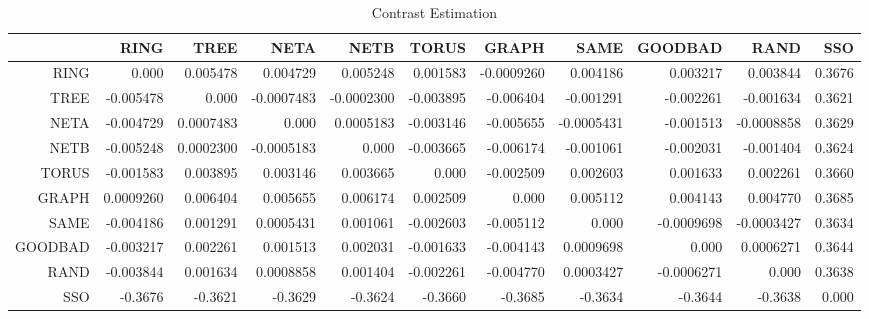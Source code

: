 \documentclass[a4paper,10pt]{article}
\begin{document}
\begin{landscape}
\begin{table}[!htp]
\centering\tiny
\caption{Contrast Estimation}
\begin{tabular}{
|r|r|r|r|r|r|r|r|r|r|r|}
\hline
 & RING& TREE& NETA& NETB& TORUS& GRAPH& SAME& GOODBAD& RAND& SSO\\
\hline
 RING&0.000&0.005478&0.004729&0.005248&0.001583&-0.0009260&0.004186&0.003217&0.003844&0.3676\\
\hline
 TREE&-0.005478&0.000&-0.0007483&-0.0002300&-0.003895&-0.006404&-0.001291&-0.002261&-0.001634&0.3621\\
\hline
 NETA&-0.004729&0.0007483&0.000&0.0005183&-0.003146&-0.005655&-0.0005431&-0.001513&-0.0008858&0.3629\\
\hline
 NETB&-0.005248&0.0002300&-0.0005183&0.000&-0.003665&-0.006174&-0.001061&-0.002031&-0.001404&0.3624\\
\hline
 TORUS&-0.001583&0.003895&0.003146&0.003665&0.000&-0.002509&0.002603&0.001633&0.002261&0.3660\\
\hline
 GRAPH&0.0009260&0.006404&0.005655&0.006174&0.002509&0.000&0.005112&0.004143&0.004770&0.3685\\
\hline
 SAME&-0.004186&0.001291&0.0005431&0.001061&-0.002603&-0.005112&0.000&-0.0009698&-0.0003427&0.3634\\
\hline
 GOODBAD&-0.003217&0.002261&0.001513&0.002031&-0.001633&-0.004143&0.0009698&0.000&0.0006271&0.3644\\
\hline
 RAND&-0.003844&0.001634&0.0008858&0.001404&-0.002261&-0.004770&0.0003427&-0.0006271&0.000&0.3638\\
\hline
 SSO&-0.3676&-0.3621&-0.3629&-0.3624&-0.3660&-0.3685&-0.3634&-0.3644&-0.3638&0.000\\
\hline

\end{tabular}
\end{table}

\newpage


\end{landscape}
\end{document}
